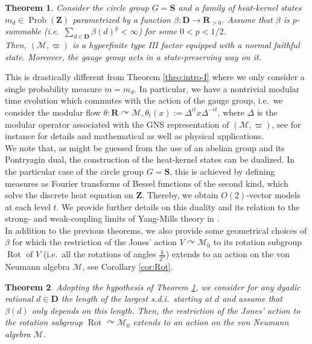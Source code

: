 \documentclass[a4paper,12pt]{amsart}
\numberwithin{equation}{section}
\newtheorem{letterthm}{Theorem}
\theoremstyle{definition}
\newcommand{\act}{\curvearrowright}
\newcommand{\D}{\mathbf D}
\newcommand{\scrM}{\mathscr M}
\DeclareMathOperator{\Prob}{Prob}
\newcommand{\R}{\mathbf{R}}
\DeclareMathOperator{\Rot}{Rot}
\newcommand{\fS}{\mathbf{S}}
\newcommand{\Z}{\mathbf{Z}}
\begin{document}
\begin{letterthm}\label{theo:intro-type}
Consider the circle group $G=\fS$ and a family of heat-kernel states $m_{d}\in\Prob(\Z)$ parametrized by a function $\beta:\D\to\R_{>0}$.
Assume that $\beta$ is $p$-summable (i.e.~$\sum_{d\in\D} \beta(d)^{p} <\infty$) for some $0<p<1/2$.\\ 
Then, $(\scrM,\varpi)$ is a hyperfinite type III factor equipped with a normal faithful state.
Moreover, the gauge group acts in a state-preserving way on it.
\end{letterthm}
This is drastically different from Theorem \ref{theo:intro-I} where we only consider a single probability measure $m=m_d.$
In particular, we have a nontrivial modular time evolution which commutes with the action of the gauge group, i.e.~we consider the modular flow $\theta:\R\act \scrM, \theta_t(x):= \Delta^{it} x\Delta^{-it}$, where $\Delta$ is the modular operator associated with the GNS representation of $(\scrM,\varpi)$, see for instance \cite{Connes-94-Noncommutative-Geometry, Bratteli-Robinson-87-Operator-Algebras1, Bratteli-Robinson-97-Operator-Algebras2, Borchers-00-Modular-Theory} for details and mathematical as well as physical applications.\\[0.1cm]
We note that, as might be guessed from the use of an abelian group and its Pontryagin dual, the construction of the heat-kernel states can be dualized. In the particular case of the circle group $G=\fS$, this is achieved by defining measures as Fourier transforms of Bessel functions of the second kind, which solve the discrete heat equation on $\Z$. Thereby, we obtain $O(2)$-vector models at each level $t$. We provide further details on this duality and its relation to the strong- and weak-coupling limits of Yang-Mills theory in {\cite[Sections 3.3 and 5.1]{Brot-Stottmeister-Phys}}.\\[0.1cm]
In addition to the previous theorems, we also provide some geometrical choices of $\beta$ for which the restriction of the Jones' action $V\act \scrM_0$ to its rotation subgroup $\Rot$ of $V$ (i.e.~all the rotations of angles $\tfrac{k}{2^n}$) extends to an action on the von Neumann algebra $\scrM$, see Corollary \ref{cor:Rot}.
\begin{letterthm}
Adopting the hypothesis of Theorem \ref{theo:intro-type}, we consider for any dyadic rational $d\in\D$ the length of the largest s.d.i.~starting at $d$ and assume that $\beta(d)$ only depends on this length.
Then, the restriction of the Jones' action to the rotation subgroup $\Rot\act \scrM_0$ extends to an action on the von Neumann algebra $\scrM$.
\end{letterthm}
\end{document}
